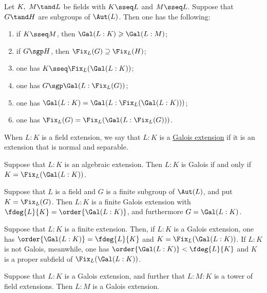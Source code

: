 \documentclass{article}
\begin{document}
  \begin{tproposition}
    Let \( K,\ M \tand L \) be fields with \( K\sseq L \) and \( M\sseq L \).
    Suppose that \( G\tand H \) are subgroups of \( \Aut(L) \).
    Then one has the following: \begin{enumerate}[label=(\alph*)]
      \item if \( K\sseq M \), then \( \Gal(L:K) \geqslant \Gal(L:M) \);
      \item if \( G\sgp H \), then \( \Fix_L(G)\supseteq \Fix_L(H) \);
      \item one has \( K\sseq \Fix_L(\Gal(L:K)) \);
      \item one has \( G\sgp\Gal(L:\Fix_L(G)) \);
      \item one has \( \Gal(L:K) = \Gal(L:\Fix_L(\Gal(L:K))) \);
      \item one has \( \Fix_L(G) = \Fix_L(\Gal(L:\Fix_L(G))) \).
    \end{enumerate}
  \end{tproposition}

  \begin{tdefinition}
    When \( L:K \) is a field extension, we say that \( L:K \) is a \ul{Galois extension} if it is an extension that is normal and separable.
  \end{tdefinition}

  \begin{ttheorem}
    Suppose that \( L:K \) is an algebraic extension.
    Then \( L:K \) is Galois if and only if \( K=\Fix_L(\Gal(L:K)) \).
  \end{ttheorem}

  \begin{ttheorem}
    Suppose that \( L \) is a field and \( G \) is a finite subgroup of \( \Aut(L) \), and put \( K=\Fix_L(G) \).
    Then \( L:K \) is a finite Galois extension with \( \fdeg{L}{K}=\order{\Gal(L:K)} \), and furthermore \( G=\Gal(L:K) \).
  \end{ttheorem}

  \begin{ttheorem}
    Suppose that \( L:K \) is a finite extension.
    Then, if \( L:K \) is a Galois extension, one has \( \order{\Gal(L:K)}=\fdeg{L}{K} \) and \( K=\Fix_L(\Gal(L:K)) \).
    If \( L:K \) is not Galois, meanwhile, one has \( \order{\Gal(L:K)}<\fdeg{L}{K} \) and \( K \) is a proper subfield of \( \Fix_L(\Gal(L:K)) \).
  \end{ttheorem}

  \begin{tproposition}
    Suppose that \( L:K \) is a Galois extension, and further that \( L:M:K \) is a tower of field extensions.
    Then \( L:M \) is a Galois extension.
  \end{tproposition}
\end{document}

